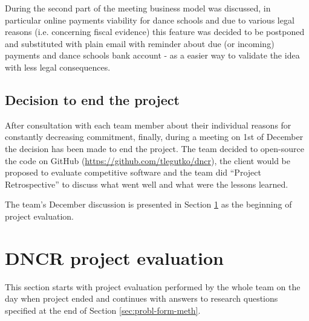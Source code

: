 \documentclass{article}
\begin{document}
During the second part of the meeting business model was discussed, in particular online payments viability for dance schools and due to various legal reasons (i.e. concerning fiscal evidence) this feature was decided to be postponed and substituted with plain email with reminder about due (or incoming) payments and dance schools bank account - as a easier way to validate the idea with less legal consequences.



\subsection{Decision to end the project}
After consultation with each team member about their individual reasons for constantly decreasing commitment, finally, during a meeting on 1st of December the decision has been made to end the project. The team decided to open-source the code on GitHub (\url{https://github.com/tlegutko/dncr}), the client would be proposed to evaluate competitive software and the team did ``Project Retrospective'' to discuss what went well and what were the lessons learned.

The team's December discussion is presented in Section \ref{sec:dncr-proj-eval} as the beginning of project evaluation.

\section{DNCR project evaluation}
\label{sec:dncr-proj-eval}
This section starts with project evaluation performed by the whole team on the day when project ended and continues with answers to research questions specified at the end of Section \ref{sec:probl-form-meth}.
\end{document}
